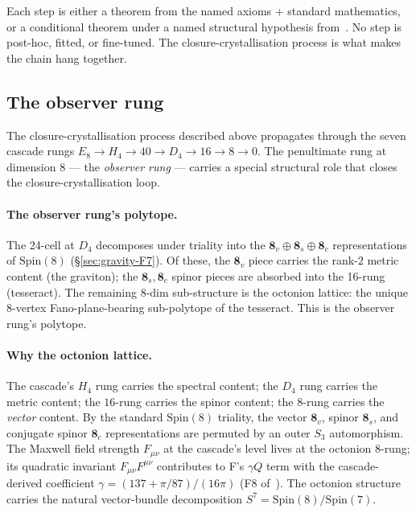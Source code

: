 \documentclass[11pt]{article}
\theoremstyle{plain}
\theoremstyle{definition}
\theoremstyle{remark}
\begin{document}
Each step is either a theorem from the named axioms + standard mathematics, or a conditional theorem under a named structural hypothesis from~\citet{SmartXXXVI}. No step is post-hoc, fitted, or fine-tuned. The closure-crystallisation process is what makes the chain hang together.

\subsection{The observer rung}\label{sec:cry-observer}

The closure-crystallisation process described above propagates through the seven cascade rungs $E_8 \to H_4 \to 40 \to D_4 \to 16 \to 8 \to 0$. The penultimate rung at dimension $8$ --- the \emph{observer rung} --- carries a special structural role that closes the closure-crystallisation loop.

\paragraph{The observer rung's polytope.} The 24-cell at $D_4$ decomposes under triality into the $\mathbf{8}_v \oplus \mathbf{8}_s \oplus \mathbf{8}_c$ representations of $\mathrm{Spin}(8)$ (\S\ref{sec:gravity-F7}). Of these, the $\mathbf{8}_v$ piece carries the rank-$2$ metric content (the graviton); the $\mathbf{8}_s, \mathbf{8}_c$ spinor pieces are absorbed into the 16-rung (tesseract). The remaining 8-dim sub-structure is the octonion lattice: the unique 8-vertex Fano-plane-bearing sub-polytope of the tesseract. This is the observer rung's polytope.

\paragraph{Why the octonion lattice.} The cascade's $H_4$ rung carries the spectral content; the $D_4$ rung carries the metric content; the $16$-rung carries the spinor content; the 8-rung carries the \emph{vector} content. By the standard $\mathrm{Spin}(8)$ triality, the vector $\mathbf{8}_v$, spinor $\mathbf{8}_s$, and conjugate spinor $\mathbf{8}_c$ representations are permuted by an outer $S_3$ automorphism. The Maxwell field strength $F_{\mu\nu}$ at the cascade's level lives at the octonion 8-rung; its quadratic invariant $F_{\mu\nu} F^{\mu\nu}$ contributes to F's $\gamma Q$ term with the cascade-derived coefficient $\gamma = (137 + \pi/87)/(16\pi)$ (F8 of~\citealp{SmartXXXVI}). The octonion structure carries the natural vector-bundle decomposition $S^7 = \mathrm{Spin}(8)/\mathrm{Spin}(7)$.
\end{document}

